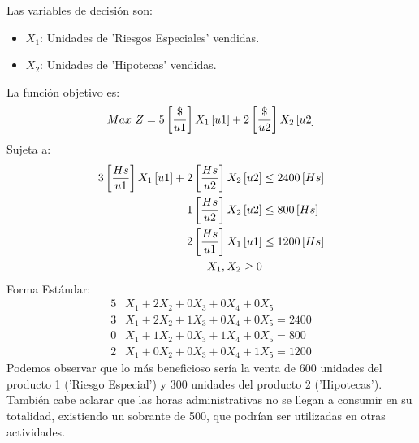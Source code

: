 \documentclass{tarea}
\begin{document}
\begin{homeworkProblem}
Las variables de decisión son:
\begin{itemize}
	\item $X_1$: Unidades de 'Riesgos Especiales' vendidas.
	\item $X_2$: Unidades de 'Hipotecas' vendidas.
\end{itemize}
La función objetivo es: 
\begin{equation}
	Max\ Z = 5\left[ \frac{\$}{u1} \right]X_1\left[ u1 \right] + 2\left[ \frac{\$}{u2} \right]X_2\left[ u2 \right]
\end{equation}
Sujeta a:
\begin{align*}
	3\left[ \frac{Hs}{u1} \right]X_1\left[ u1 \right] + 2\left[ \frac{Hs}{u2} \right]X_2\left[ u2 \right] &\le 2400\left[ Hs \right] \\
	1\left[ \frac{Hs}{u2} \right]X_2\left[ u2 \right] &\le 800\left[ Hs \right]\\
	2\left[ \frac{Hs}{u1} \right]X_1\left[ u1 \right] &\le 1200\left[ Hs \right]\\
	X_1,X_2 \ge 0	
\end{align*}
Forma Estándar:
\begin{align*}
5&X_1 + 2X_2 + 0X_3 +0X_4 + 0X_5 \\
3&X_1 + 2X_2 + 1X_3 + 0X_4 + 0X_5 = 2400 \\
0&X_1 + 1X_2 + 0X_3 + 1X_4 + 0X_5 = 800 \\
2&X_1 + 0X_2 + 0X_3 + 0X_4 + 1X_5 = 1200
\end{align*}
Podemos observar que lo más beneficioso sería la venta de 600 unidades del producto 1 ('Riesgo Especial') y 300 unidades del producto 2 ('Hipotecas').
También cabe aclarar que las horas administrativas no se llegan a consumir en su totalidad, existiendo un sobrante de 500, que podrían ser utilizadas en otras actividades.
\end{homeworkProblem}
\end{document}
